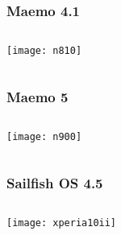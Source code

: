 \documentclass[
	notes=none,
	aspectratio=169
]{beamer}
\begin{document}

\begin{frame}
\frametitle{Maemo 4.1}

\begin{columns}[T]
\begin{column}[T]{1.0\textwidth}

\vspace{0.5cm}
\begin{center}
\texttt{[image: n810]}
\end{center}

\end{column}
\end{columns}

\end{frame}
\note{
}


\begin{frame}
\frametitle{Maemo 5}

\begin{columns}[T]
\begin{column}[T]{1.0\textwidth}

\vspace{0.8cm}
\begin{center}
\texttt{[image: n900]}
\end{center}

\end{column}
\end{columns}

\end{frame}
\note{
}


\begin{frame}
\frametitle{Sailfish OS 4.5}

\begin{columns}[T]
\begin{column}[T]{1.0\textwidth}

\vspace{0.3cm}
\begin{center}
\texttt{[image: xperia10ii]}
\end{center}

\end{column}
\end{columns}

\end{frame}
\note{
}
\end{document}
